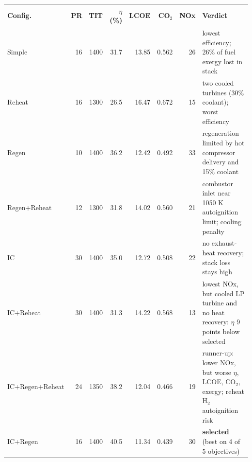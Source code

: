 \begin{tabular}{@{}lrrrrrrp{2.9cm}@{}}\toprule Config. & PR & TIT & $\eta$ (\%) & LCOE & CO$_2$ & NOx & Verdict\\\midrule
Simple & 16 & 1400 & 31.7 & 13.85 & 0.562 & 26 & lowest efficiency; 26\% of fuel exergy lost in stack\\
Reheat & 16 & 1300 & 26.5 & 16.47 & 0.672 & 15 & two cooled turbines (30\% coolant); worst efficiency\\
Regen & 10 & 1400 & 36.2 & 12.42 & 0.492 & 33 & regeneration limited by hot compressor delivery and 15\% coolant\\
Regen+Reheat & 12 & 1300 & 31.8 & 14.02 & 0.560 & 21 & combustor inlet near 1050 K autoignition limit; cooling penalty\\
IC & 30 & 1400 & 35.0 & 12.72 & 0.508 & 22 & no exhaust-heat recovery; stack loss stays high\\
IC+Reheat & 30 & 1400 & 31.3 & 14.22 & 0.568 & 13 & lowest NOx, but cooled LP turbine and no heat recovery: $\eta$ 9 points below selected\\
IC+Regen+Reheat & 24 & 1350 & 38.2 & 12.04 & 0.466 & 19 & runner-up: lower NOx, but worse $\eta$, LCOE, CO$_2$, exergy; reheat H$_2$ autoignition risk\\
IC+Regen & 16 & 1400 & 40.5 & 11.34 & 0.439 & 30 & \textbf{selected} (best on 4 of 5 objectives)\\
\bottomrule\end{tabular}